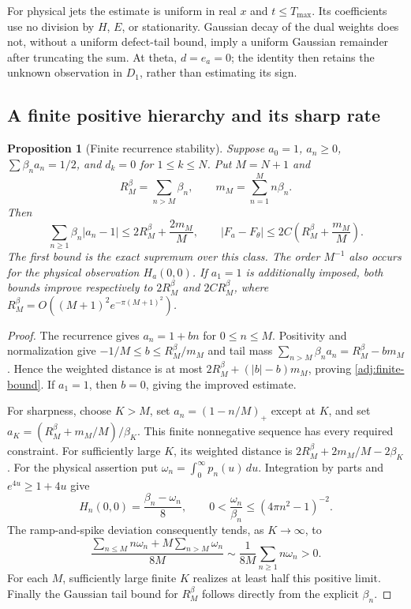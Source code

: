 \documentclass[11pt]{article}
\numberwithin{equation}{section}
\newtheorem{proposition}[theorem]{Proposition}
\theoremstyle{definition}
\theoremstyle{remark}
\begin{document}
For physical jets the estimate is uniform in real $x$ and
$t\le T_{\max}$.  Its coefficients use no division by $H$, $E$,
or stationarity.  Gaussian decay of the dual weights does not,
without a uniform defect-tail bound, imply a uniform Gaussian
remainder after truncating the sum.
At theta, $d=e_a=0$; the identity then retains the unknown
observation in $D_1$, rather than estimating its sign.

\subsection{A finite positive hierarchy and its sharp rate}

\begin{proposition}[Finite recurrence stability]
\label{adj:finite-hierarchy}
Suppose $a_0=1$, $a_n\ge0$, $\sum\beta_na_n=1/2$, and
$d_k=0$ for $1\le k\le N$.  Put $M=N+1$ and
\[
 R^\beta_M=\sum_{n>M}\beta_n,\qquad
 m_M=\sum_{n=1}^M n\beta_n.
\]
Then
\begin{equation}
 \sum_{n\ge1}\beta_n|a_n-1|
 \le2R^\beta_M+\frac{2m_M}{M},\qquad
 |F_a-F_\theta|\le2C\left(R^\beta_M+\frac{m_M}{M}\right).
 \label{adj:finite-bound}
\end{equation}
The first bound is the exact supremum over this class.
The order $M^{-1}$ also occurs for the physical observation $H_a(0,0)$.
If $a_1=1$ is additionally imposed, both bounds improve respectively
to $2R^\beta_M$ and $2CR^\beta_M$, where
$R^\beta_M=O((M+1)^2e^{-\pi(M+1)^2})$.
\end{proposition}
\begin{proof}
The recurrence gives $a_n=1+bn$ for $0\le n\le M$.
Positivity and normalization give
$-1/M\le b\le R^\beta_M/m_M$ and tail mass
$\sum_{n>M}\beta_na_n=R^\beta_M-bm_M$.
Hence the weighted distance is at most
$2R^\beta_M+(|b|-b)m_M$, proving \eqref{adj:finite-bound}.
If $a_1=1$, then $b=0$, giving the improved estimate.

For sharpness, choose $K>M$, set $a_n=(1-n/M)_+$ except at $K$,
and set $a_K=(R^\beta_M+m_M/M)/\beta_K$.
This finite nonnegative sequence has every required constraint.
For sufficiently large $K$, its weighted distance is
$2R^\beta_M+2m_M/M-2\beta_K$.
For the physical assertion put $\omega_n=\int_0^\infty p_n(u)\,du$.
Integration by parts and $e^{4u}\ge1+4u$ give
\[
 H_n(0,0)=\frac{\beta_n-\omega_n}{8},\qquad
 0<\frac{\omega_n}{\beta_n}
 \le(4\pi n^2-1)^{-2}.
\]
The ramp-and-spike deviation consequently tends, as $K\to\infty$, to
\[
 \frac{\sum_{n\le M}n\omega_n+
                     M\sum_{n>M}\omega_n}{8M}
 \sim\frac1{8M}\sum_{n\ge1}n\omega_n>0.
\]
For each $M$, sufficiently large finite $K$ realizes at least half
this positive limit.  Finally the Gaussian tail bound for
$R^\beta_M$ follows directly from the explicit $\beta_n$.
\end{proof}
\end{document}
